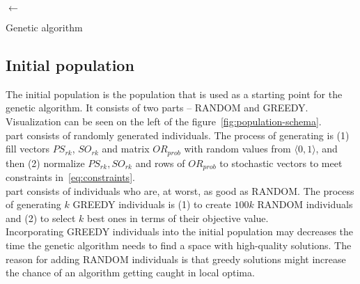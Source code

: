 \begin{algorithm}[H]
    \SetAlgoLined
    \LinesNumbered





    \Population $\leftarrow$ \GenerateInitialPopulation \\

    \KwRet{\SelectBest{\Population}}

    \caption{Genetic algorithm}\label{alg:genetic}
\end{algorithm}

\subsection{Initial population}\label{subsec:initial-population}
The initial population is the population that is used as a starting point for the genetic algorithm.
It consists of two parts – RANDOM and GREEDY.
Visualization can be seen on the left of the figure~\ref{fig:population-schema}.
\\

 part consists of randomly generated individuals.
The process of generating is (1) fill vectors $PS_{rk}$, $SO_{rk}$ and matrix $OR_{prob}$ with random values from $\langle 0,1 \rangle$,
and then (2) normalize $PS_{rk}, SO_{rk}$ and rows of $OR_{prob}$  to stochastic vectors to meet constraints in~\ref{eq:constraints}.\\

 part consists of individuals who are, at worst, as good as RANDOM.
The process of generating $k$ GREEDY individuals is (1) to create $100k$ RANDOM individuals and (2) to select $k$ best ones
in terms of their objective value.\\

Incorporating GREEDY individuals into the initial population may decreases the time the genetic algorithm needs to find a space with high-quality solutions.
The reason for adding RANDOM individuals is that greedy solutions might increase the chance
of an algorithm getting caught in local optima.

